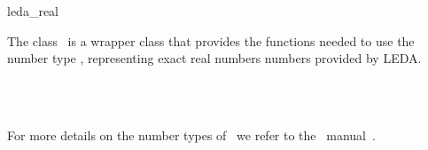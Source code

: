 \ccDefGlobalScope{}
\begin{ccRefClass}{leda_real}

\ccDefinition

The class \ccRefName\ is a wrapper class that provides the functions needed to
use the number type , representing exact real numbers
numbers provided by {\sc LEDA}. 


\ccIsModel
{}\\
\\

For more details on the number types of \leda\ we refer to the \leda\
manual~\cite{cgal:mnsu-lum}.

\end{ccRefClass}
